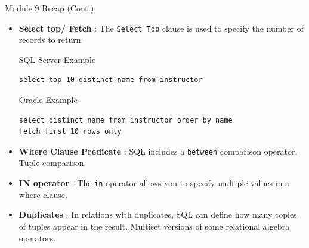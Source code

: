 \documentclass[aspectratio=169, xcolor=dvipsnames]{beamer}
\begin{document}
\begin{frame}[fragile]{Module 9 Recap (Cont.)}
    \begin{itemize}[<+->]
        \item \textbf{Select top/ Fetch} : The \texttt{Select Top} clause is used to specify the number of records to return. 
        \begin{exampleblock}{SQL Server Example}
            \begin{verbatim}select top 10 distinct name from instructor\end{verbatim}
        \end{exampleblock}
        \begin{exampleblock}{Oracle Example}
            \begin{verbatim}select distinct name from instructor order by name 
fetch first 10 rows only\end{verbatim}
        \end{exampleblock}
        \item \textbf{Where Clause Predicate} : SQL includes a \texttt{between} comparison operator, Tuple comparison.
        \item \textbf{IN operator} : The \texttt{in} operator allows you to specify multiple values in a where clause.
        \item \textbf{Duplicates} : In relations with duplicates, SQL can define how many copies of tuples appear in the result. Multiset versions of some relational algebra operators.
    \end{itemize}
\end{frame}
\end{document}
